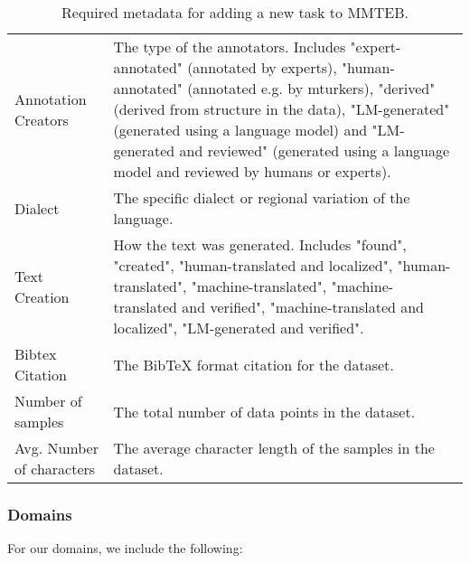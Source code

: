 \begin{table*}[!ht]
{\begin{tabular}{lp{\linewidth}}
        Annotation Creators & The type of the annotators. Includes "expert-annotated" (annotated by experts), "human-annotated" (annotated e.g. by mturkers), "derived" (derived from structure in the data), "LM-generated" (generated using a language model) and "LM-generated and reviewed" (generated using a language model and reviewed by humans or experts).\\
        Dialect & The specific dialect or regional variation of the language. \\
        Text Creation & How the text was generated. Includes "found", "created", "human-translated and localized", "human-translated", "machine-translated", "machine-translated and verified", "machine-translated and localized", "LM-generated and verified". \\
        Bibtex Citation & The BibTeX format citation for the dataset. \\
        Number of samples & The total number of data points in the dataset. \\
        Avg. Number of characters & The average character length of the samples in the dataset.\\ \bottomrule
    \end{tabular}
    }  %
    \caption{Required metadata for adding a new task to MMTEB.}
    \label{tab:task_metadata}
\end{table*}


\subsubsection{Domains}\label{appendix:Domains}
For our domains, we include the following: 

